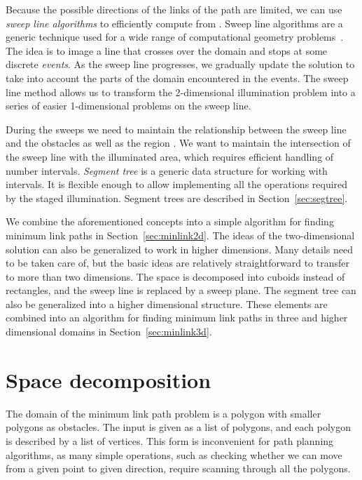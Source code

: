 \documentclass[english,gradu]{tktltiki2018}
\begin{document}
Because the possible directions of the links of the path are limited, we can use \emph{sweep line algorithms} to efficiently compute  from .
Sweep line algorithms are a generic technique used for a wide range of computational geometry problems~\cite[Section 33.2]{clrs}.
The idea is to image a line that crosses over the domain and stops at some discrete \emph{events}.
As the sweep line progresses, we gradually update the solution to take into account the parts of the domain encountered in the events.
The sweep line method allows us to transform the 2-dimensional illumination problem into a series of easier 1-dimensional problems on the sweep line.

During the sweeps we need to maintain the relationship between the sweep line and the obstacles as well as the region .
We want to maintain the intersection of the sweep line with the illuminated area, which requires efficient handling of number intervals.
\emph{Segment tree} is a generic data structure for working with intervals.
It is flexible enough to allow implementing all the operations required by the staged illumination.
Segment trees are described in Section~\ref{sec:segtree}.

We combine the aforementioned concepts into a simple algorithm for finding minimum link paths in Section~\ref{sec:minlink2d}.
The ideas of the two-dimensional solution can also be generalized to work in higher dimensions.
Many details need to be taken care of, but the basic ideas are relatively straightforward to transfer to more than two dimensions.
The space is decomposed into cuboids instead of rectangles, and the sweep line is replaced by a sweep plane.
The segment tree can also be generalized into a higher dimensional structure.
These elements are combined into an algorithm for finding minimum link paths in three and higher dimensional domains in Section~\ref{sec:minlink3d}.



\section{Space decomposition}\label{sec:decomposition}

The domain of the minimum link path problem is a polygon with smaller polygons as obstacles.
The input is given as a list of polygons, and each polygon is described by a list of vertices.
This form is inconvenient for path planning algorithms, as many simple operations, such as checking whether we can move from a given point to given direction, require scanning through all the polygons.
\end{document}
